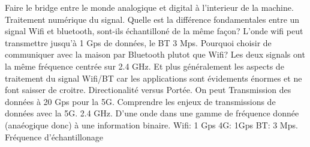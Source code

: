 \documentclass[12pt,svgnames]{article}
\begin{document}
Faire le bridge entre le monde analogique et digital à l'interieur de la machine. Traitement numérique du signal. Quelle est la différence fondamentales entre un signal Wifi et bluetooth, sont-ils échantilloné de la même façon? L'onde wifi peut transmettre jusqu'à 1 Gps de données, le BT 3 Mps\cite{}.  Pourquoi choisir de communiquer avec la maison par Bluetooth plutot que Wifi? Les deux signals ont la même fréquence centrée sur 2.4 GHz. Et plus généralement les aspects de traitement du signal Wifi/BT car les applications sont évidements énormes et ne font saisser de croitre. Directionalité versus Portée. On peut
Transmission des données à 20 Gps pour la 5G. Comprendre les enjeux de transmissions de données avec la 5G. 2.4 GHz.
D'une onde dans une gamme de fréquence donnée (anaéogique donc) à une information binaire.
Wifi: 1 Gps
4G: 1Gps
BT: 3 Mps.
Fréquence d'échantillonage



\end{document}

